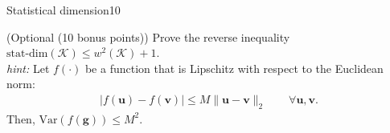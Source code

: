 \documentclass{article}
\begin{document}
\begin{problem}{Statistical dimension}{10}
{}


 (Optional (10 bonus points)) Prove the reverse inequality $  \text{stat-dim}(\mathcal{K}) \leq w^2(\mathcal{K}) + 1 $. \\
\emph{hint: }Let $f(\cdot)$ be a function that is Lipschitz with respect to the Euclidean norm:
	\begin{align*}
	|f(\bm{u})-f(\bm{v})|\leq M\|\bm{u}-\bm{v}\|_2\quad\quad\forall \bm{u},\bm{v}.	
	\end{align*}
Then, $	\text{Var}(f(\bm{g}))\leq M^2$.



\end{problem}
\end{document}
